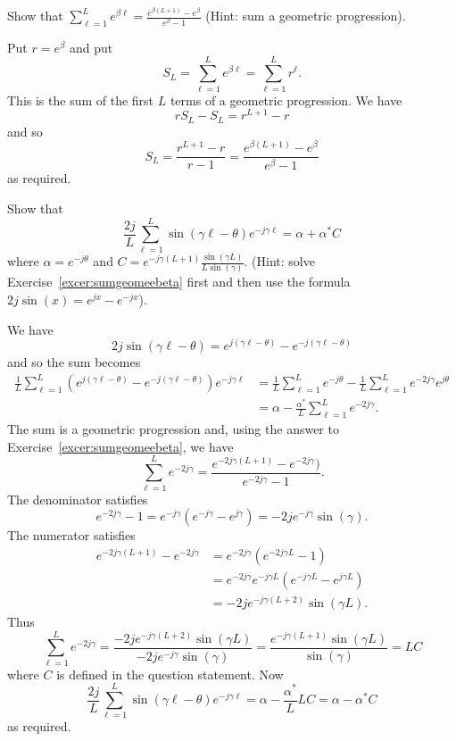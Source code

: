 \begin{excersizelist}
\begin{solution}
\begin{center}
\begin{tikzpicture}
  \end{tikzpicture}
\end{center}


\end{solution}

\item \label{excer:sumgeomeebeta} Show that $\sum_{\ell = 1}^L e^{\beta \ell} = \frac{e^{\beta (L+1)} - e^\beta}{e^\beta - 1}$  (Hint: sum a geometric progression).
\begin{solution}
Put $r = e^\beta$ and put
\[
S_L = \sum_{\ell = 1}^L e^{\beta \ell} = \sum_{\ell = 1}^L r^\ell.
\]
This is the sum of the first $L$ terms of a geometric progression.  We have
\[
r S_L - S_L = r^{L+1} - r
\]
and so
\[
S_L = \frac{r^{L+1} - r}{r - 1} =  \frac{e^{\beta (L+1)} - e^\beta}{e^\beta - 1}
\]
as required.
\end{solution}


\item \label{excer:sumsinegeomean} Show that 
\[
\frac{2j}{L}\sum_{\ell=1}^{L}\sin( \gamma \ell - \theta)  e^{-j \gamma \ell} = \alpha + \alpha^*C
\]
where $\alpha = e^{-j\theta}$ and $C = e^{-j\gamma (L+1)}\frac{\sin(\gamma L)}{L\sin(\gamma)}$. (Hint: solve Exercise~\ref{excer:sumgeomeebeta} first and then use the formula $2j\sin(x) = e^{jx} -  e^{-jx}$).
\begin{solution}
We have 
\[
2j\sin(\gamma \ell - \theta) = e^{j(\gamma \ell - \theta)} -  e^{-j(\gamma \ell - \theta)}
\]
and so the sum becomes
\begin{align*}
\frac{1}{L}\sum_{\ell=1}^{L}(e^{j(\gamma \ell - \theta)} - e^{-j(\gamma \ell - \theta)})  e^{-j \gamma \ell} &= \frac{1}{L}\sum_{\ell=1}^{L}e^{-j\theta} - \frac{1}{L}\sum_{\ell=1}^{L}e^{-2j\gamma}e^{j\theta} \\
&= \alpha - \frac{\alpha^*}{L}\sum_{\ell=1}^{L}e^{-2j\gamma}.
\end{align*}
The sum is a geometric progression and, using the answer to Exercise~\ref{excer:sumgeomeebeta}, we have
\[
\sum_{\ell=1}^{L}e^{-2j\gamma} = \frac{e^{-2j\gamma (L+1)} - e^{-2j\gamma})}{e^{-2j\gamma} - 1}.
\]
The denominator satisfies
\[
e^{-2j\gamma} - 1 = e^{-j\gamma}(e^{-j\gamma} - e^{j\gamma}) = -2 j e^{-j\gamma} \sin(\gamma). 
\]
The numerator satisfies
\begin{align*}
e^{-2j\gamma (L+1)} - e^{-2j\gamma} &= e^{-2j\gamma}(e^{-2j\gamma L} - 1) \\
&= e^{-2j\gamma}e^{-j\gamma L} (e^{-j\gamma L} - e^{j\gamma L}) \\
&= -2 j e^{-j\gamma(L+2)} \sin(\gamma L).
\end{align*}
Thus
\[
\sum_{\ell=1}^{L}e^{-2j\gamma} = \frac{-2 j e^{-j\gamma(L+2)} \sin(\gamma L)}{-2 j e^{-j\gamma} \sin(\gamma)} = \frac{e^{-j\gamma(L+1)} \sin(\gamma L)}{ \sin(\gamma)} = L C
\]
where $C$ is defined in the question statement.  Now
\[
\frac{2j}{L}\sum_{\ell=1}^{L}\sin( \gamma \ell - \theta)  e^{-j \gamma \ell} = \alpha - \frac{\alpha^*}{L}LC = \alpha - \alpha^*C
\]
as required.
\end{solution}


\end{excersizelist}
